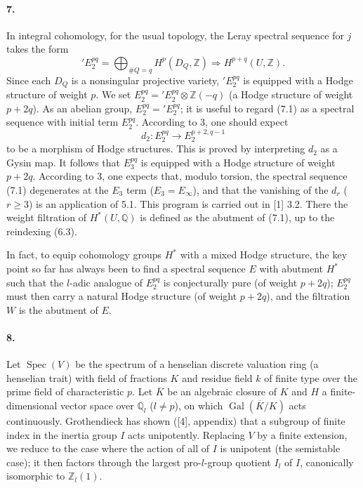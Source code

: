 \documentclass[10pt]{article}
\newcommand{\Q}{\mathbb Q}
\newcommand{\Z}{\mathbb Z}
\newcommand{\Gal}{\operatorname{Gal}}
\newcommand{\Spec}{\operatorname{Spec}}
\newcommand{\barK}{\overline{K}}
\begin{document}
\paragraph{7.} In integral cohomology, for the usual topology, the Leray spectral sequence for $j$ takes the form
\[
\tag{7.1}
{}'E_2^{pq}=\bigoplus_{\#Q=q}H^p(D_Q,\Z)\Rightarrow H^{p+q}(U,\Z).
\]
Since each $D_Q$ is a nonsingular projective variety, ${}'E_2^{pq}$ is equipped with a Hodge structure of weight $p$. We set $E_2^{pq}={}'E_2^{pq}\otimes\Z(-q)$ (a Hodge structure of weight $p+2q$). As an abelian group, $E_2^{pq}={}'E_2^{pq}$; it is useful to regard (7.1) as a spectral sequence with initial term $E_2^{pq}$. According to 3, one should expect
\[
d_2:E_2^{pq}\to E_2^{p+2,q-1}
\]
to be a morphism of Hodge structures. This is proved by interpreting $d_2$ as a Gysin map. It follows that $E_3^{pq}$ is equipped with a Hodge structure of weight $p+2q$. According to 3, one expects that, modulo torsion, the spectral sequence (7.1) %
degenerates at the $E_3$ term ($E_3=E_\infty$), and that the vanishing of the $d_r$ ($r\ge3$) is an application of 5.1. This program is carried out in [1] 3.2. There the weight filtration of $H^*(U,\Q)$ is defined as the abutment of (7.1), up to the reindexing (6.3).

In fact, to equip cohomology groups $H^*$ with a mixed Hodge structure, the key point so far has always been to find a spectral sequence $E$ with abutment $H^*$ such that the $l$-adic analogue of $E_2^{pq}$ is conjecturally pure (of weight $p+2q$); $E_2^{pq}$ must then carry a natural Hodge structure (of weight $p+2q$), and the filtration $W$ is the abutment of $E$.

\paragraph{8.} Let $\Spec(V)$ be the spectrum of a henselian discrete valuation ring (a henselian trait) with field of fractions $K$ and residue field $k$ of finite type over the prime field of characteristic $p$. Let $\barK$ be an algebraic closure of $K$ and $H$ a finite-dimensional vector space over $\Q_l$ ($l\ne p$), on which $\Gal(\barK/K)$ acts continuously. Grothendieck has shown ([4], appendix) that a subgroup of finite index in the inertia group $I$ acts unipotently. Replacing $V$ by a finite extension, we reduce to the case where the action of all of $I$ is unipotent (the semistable case); it then factors through the largest pro-$l$-group quotient $I_l$ of $I$, canonically isomorphic to $\Z_l(1)$. %
\end{document}
